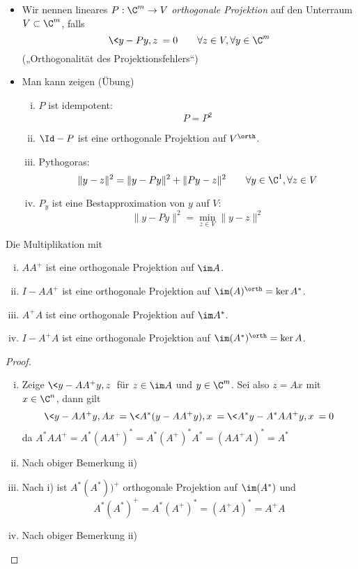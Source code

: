 \documentclass[a4paper,11pt]{scrartcl}
\begin{document}
\begin{nt*}
	\begin{itemize}
		\item
			Wir nennen lineares $P: \C^m \to V$ \emph{orthogonale Projektion} auf den Unterraum $V\subset \C^m$, falls
			\[
				\<y- Py,z\> = 0 \qquad \forall z\in V, \forall y\in \C^m
			\]
			(„Orthogonalität des Projektionsfehlers“)
		\item
			Man kann zeigen (Übung)
			\begin{enumerate}[i)]
				\item
					$P$ ist idempotent:
					\[
						P = P^2
					\]
				\item
					$\Id - P$ ist eine orthogonale Projektion auf $V^\orth$.
				\item
					Pythogoras:
					\[
						\|y-z\|^2 = \|y-Py\|^2 + \|Py-z\|^2 \qquad \forall y\in \C^1,\forall z\in V
					\]
				\item
					$P_y$ ist eine Bestapproximation von $y$ auf $V$:
					\[
						\|y-Py\|^2 = \min_{z\in V}\|y-z\|^2
					\]
			\end{enumerate}
	\end{itemize}
\end{nt*}

\begin{lem}
	\label{1.42}
	Die Multiplikation mit
	\begin{enumerate}[i)]
		\item
			$AA^+$ ist eine orthogonale Projektion auf $\im A$.
		\item
			$I-AA^+$ ist eine orthogonale Projektion auf $\im (A)^\orth = \ker A^*$.
		\item
			$A^+A$ ist eine orthogonale Projektion auf $\im A^*$.
		\item
			$I-A^+A$ ist eine orthogonale Projektion auf $\im (A^*)^\orth = \ker A$.
	\end{enumerate}
	\begin{proof}
		\begin{enumerate}[i)]
			\item
				Zeige $\<y-AA^+y, z\>$ für $z\in \im A$ und $y\in \C^m$.
				Sei also $z=Ax$ mit $x\in \C^n$, dann gilt
				\[
					\<y-AA^+y,Ax\> = \<A^*(y-AA^+y),x\> = \<A^*y - A^*AA^+y,x\> = 0
				\]
				da $A^*AA^+ = A^*(AA^+)^* = A^*(A^+)^* A^* = (AA^+A)^* = A^*$
			\item
				Nach obiger Bemerkung ii)
			\item
				Nach i) ist $A^*(A^*))^+$ orthogonale Projektion auf $\im (A^*)$ und
				\[
					A^*(A^*)^+ = A^*(A^+)^* = (A^+A)^* = A^+A
				\]
			\item
				Nach obiger Bemerkung ii)
		\end{enumerate}
	\end{proof}
\end{lem}
\end{document}
